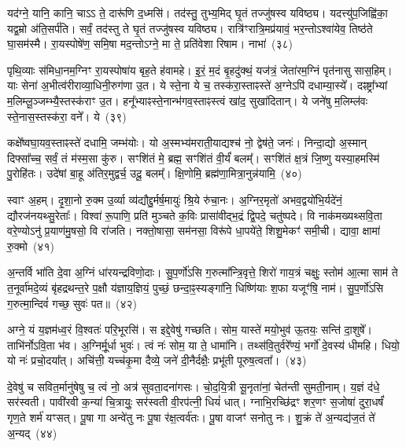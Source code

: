 यद॑ग्ने॒ यानि॒ कानि॒ चाऽऽ ते॒ दारू॑णि द॒ध्मसि॑। तद॑स्तु॒ तुभ्य॒मिद् घृ॒तं तज्जु॑षस्व यविष्ठ्य। यदत्त्यु॑प॒जिह्वि॑का॒ यद्व॒म्रो अ॑ति॒सर्प॑ति। सर्वं॒ तद॑स्तु ते घृ॒तं तज्जु॑षस्व यविष्ठ्य। रात्रि॑ꣳरात्रि॒मप्र॑यावं॒ भर॒न्तो\-ऽश्वा॑येव॒ तिष्ठ॑ते घा॒सम॑स्मै। रा॒यस्पोषे॑ण॒ समि॒षा मद॒न्तो\-ऽग्ने॒ मा ते॒ प्रति॑वेशा रिषाम। नाभा॑~(३८)\ip

पृथि॒व्याः स॑मिधा॒नम॒ग्निꣳ रा॒यस्पोषा॑य बृह॒ते ह॑वामहे। इ॒रं॒ म॒दं बृ॒हदु॑क्थं॒ यज॑त्रं॒ जेता॑रम॒ग्निं पृत॑नासु सास॒हिम्। याः सेना॑ अ॒भीत्व॑रीराव्या॒धिनी॒रुग॑णा उ॒त। ये स्ते॒ना ये च॒ तस्क॑रा॒स्ताꣴस्ते॑ अ॒ग्ने\-ऽपि॑ दधाम्या॒स्ये᳚। दꣴष्ट्रा᳚भ्यां म॒लिम्लू॒ञ्जम्भ्यै॒स्तस्क॑राꣳ उ॒त। हनू᳚भ्याꣴस्ते॒नान्भ॑गव॒स्ताꣴस्त्वं खा॑द॒ सुखा॑दितान्। ये जने॑षु म॒लिम्ल॑वः स्ते॒नास॒स्तस्क॑रा॒ वने᳚। ये~(३९)\ip

कक्षे᳚ष्वघा॒यव॒स्ताꣴस्ते॑ दधामि॒ जम्भ॑योः। यो अ॒स्मभ्य॑मरा\-ती॒याद्यश्च॑ नो॒ द्वेष॑ते॒ जनः॑। निन्दा॒द्यो अ॒स्मान् दिफ्सा᳚च्च॒ सर्वं॒ तं म॑स्म॒सा कु॑रु। सꣳशि॑तं मे॒ ब्रह्म॒ सꣳशि॑तं वी॒र्यं॑ बलम्᳚। सꣳशि॑तं क्ष॒त्रं जि॒ष्णु यस्या॒हमस्मि॑ पु॒रोहि॑तः। उदे॑षां बा॒हू अ॑तिर॒मुद्वर्च॒ उदू॒ बलम्᳚। क्षि॒णोमि॒ ब्रह्म॑णा॒मित्रा॒नुन्न॑यामि॒~(४०)\ip

स्वाꣳ अ॒हम्। दृ॒शा॒नो रु॒क्म उ॒र्व्या व्य॑द्यौद्दु॒र्मर्\mbox{}ष॒मायुः॑ श्रि॒ये रु॑चा॒नः। अ॒ग्निर॒मृतो॑ अभव॒द्वयो॑भि॒र्यदे॑नं॒ द्यौरज॑नयथ्सु॒रेताः᳚। विश्वा॑ रू॒पाणि॒ प्रति॑ मुञ्चते क॒विः प्रासा॑वीद्भ॒द्रं द्वि॒पदे॒ चतु॑ष्पदे। वि नाक॑मख्यथ्सवि॒ता वरे॒ण्यो\-ऽनु॑ प्र॒याण॑मु॒षसो॒ वि रा॑जति। नक्तो॒षासा॒ सम॑नसा॒ विरू॑पे धा॒पये॑ते॒ शिशु॒मेकꣳ॑ समी॒ची। द्यावा॒ क्षामा॑ रु॒क्मो~(४१)\ip

अ॒न्तर्वि भा॑ति दे॒वा अ॒ग्निं धा॑रयन्द्रविणो॒दाः। सु॒प॒र्णो॑\-ऽसि ग॒रुत्मा᳚न्त्रि॒वृत्ते॒ शिरो॑ गाय॒त्रं चक्षुः॒ स्तोम॑ आ॒त्मा साम॑ ते त॒नूर्वा॑मदे॒व्यं बृ॑हद्रथन्त॒रे प॒क्षौ य॑ज्ञाय॒ज्ञियं॒ पुच्छं॒ छन्दा॒ꣴ॒स्यङ्गा॑नि॒ धिष्णि॑याः श॒फा यजूꣳ॑षि॒ नाम॑। सु॒प॒र्णो॑\-ऽसि ग॒रुत्मा॒न्दिवं॑ गच्छ॒ सुवः॑ पत॥~(४२)\ip

{\anuvakamend[{नाभा॒ वने॒ येन॑ यामि॒ क्षामा॑ रु॒क्मो᳚\-ऽष्टात्रिꣳ॑शच्च}]}%

अग्ने॒ यं य॒ज्ञम॑ध्व॒रं वि॒श्वतः॑ परि॒भूरसि॑। स इद्दे॒वेषु॑ गच्छति। सोम॒ यास्ते॑ मयो॒भुव॑ ऊ॒तयः॒ सन्ति॑ दा॒शुषे᳚। ताभि॑र्नो\-ऽवि॒ता भ॑व। अ॒ग्निर्मू॒र्धा भुवः॑। त्वं नः॑ सोम॒ या ते॒ धामा॑नि। तथ्स॑वि॒तुर्वरे᳚ण्यं॒ भर्गो॑ दे॒वस्य॑ धीमहि। धियो॒ यो नः॑ प्रचो॒दया᳚त्। अचि॑त्ती॒ यच्च॑कृ॒मा दैव्ये॒ जने॑ दी॒नैर्दक्षैः॒ प्रभू॑ती पूरुष॒त्वता᳚।~(४३)\ip

दे॒वेषु॑ च सवित॒र्मानु॑षेषु च॒ त्वं नो॒ अत्र॑ सुवता॒दना॑गसः। चो॒द॒यि॒त्री सू॒नृता॑नां॒ चेत॑न्ती सुमती॒नाम्। य॒ज्ञं द॑धे॒ सर॑स्वती। पावी॑रवी क॒न्या॑ चि॒त्रायुः॒ सर॑स्वती वी॒रप॑त्नी॒ धियं॑ धात्। ग्नाभि॒रच्छि॑द्रꣳ शर॒णꣳ स॒जोषा॑ दुरा॒धर्\mbox{}षं॑ गृण॒ते शर्म॑ यꣳसत्। पू॒षा गा अन्वे॑तु नः पू॒षा र॑क्ष॒त्वर्व॑तः। पू॒षा वाजꣳ॑ सनोतु नः। शु॒क्रं ते॑ अ॒न्यद्य॑ज॒तं ते॑ अ॒न्यद्~(४४)\ip

